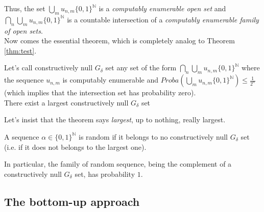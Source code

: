 Thus, the set $\bigcup_{m} u_{n,m}{\{0,1\}^{\mathbb N}}$ is a
{\em computably enumerable open set} and
$\bigcap_{n} \bigcup_{m} u_{n,m}{\{0,1\}^{\mathbb N}}$
is a countable intersection of a
{\em computably enumerable family of open sets}.
\medskip\\
Now comes the essential theorem, which is completely analog
to Theorem \ref{thm:test}.
\begin{theorem}
Let's call constructively null $G_\delta$ set any set of the form
$\bigcap_{n} \bigcup_{m} u_{n,m}{\{0,1\}^{\mathbb N}}$
where the sequence $u_{n,m}$ is computably enumerable
and $Proba(\bigcup_{m} u_{n,m}{\{0,1\}^{\mathbb N}})\leq \frac{1}{2^n}$
(which implies that the intersection set has probability zero).
\\
There exist a largest constructively null $G_\delta$ set
\end{theorem}
Let's insist that the theorem says {\em largest}, up to nothing, 
really largest.
\begin{definition}
A sequence $\alpha\in{\{0,1\}^{\mathbb N}}$ is random if it belongs to no
constructively null $G_\delta$ set
(i.e. if it does not belongs to the largest one).
\end{definition}
In particular, the family of random sequence, being the complement
of a constructively null $G_\delta$ set, has probability $1$.
\subsection{The bottom-up approach}
